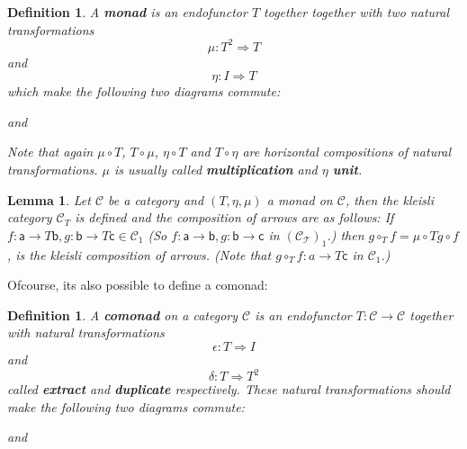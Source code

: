 \documentclass{article}
\newcommand{\cat}[1]{\mathcal{#1}} %
\newcommand{\catm}[1]{\cat{#1}_1} %
\newcommand{\ob}[1]{\mathsf{#1}} %
\newtheorem{lemma}[theorem]{Lemma}
\newtheorem{definition}[theorem]{Definition}
\begin{document}
\begin{definition}
	A \textbf{monad} is an endofunctor $T$ together together with two natural transformations
	$$ \mu: T^2 \Rightarrow T $$
	and
	$$ \eta: I \Rightarrow T $$
	which make the following two diagrams commute:

	and
	Note that again $\mu \circ T$, $T \circ \mu$, $\eta \circ T$ and $T \circ \eta$ are horizontal compositions of natural transformations.
	$\mu$ is usually called \textbf{multiplication} and $\eta$ \textbf{unit}.
\end{definition}

\begin{lemma}
	Let $\cat{C}$ be a category and $(T, \eta, \mu)$ a monad on $\cat{C}$, then the kleisli category $\cat{C}_T$ is defined and the composition of arrows are as follows:
	If $f: \ob{a} \rightarrow T\ob{b}, g: \ob{b} \rightarrow T\ob{c} \in \catm{C}$ (So $f: \ob{a} \rightarrow \ob{b}, g: \ob{b} \rightarrow \ob{c}$ in $(\cat{C_T})_1$.)
	then $g \circ_T f = \mu \circ Tg \circ f$, is the kleisli composition of arrows. (Note that $g \circ_T f: a \rightarrow T\ob{c}$ in $\catm{C}$.)
\end{lemma}

Ofcourse, its also possible to define a comonad:

\begin{definition}
	A \textbf{comonad} on a category $\cat{C}$ is an endofunctor $T: \cat{C} \rightarrow \cat{C}$ together with natural transformations
	$$ \epsilon: T \Rightarrow I $$
	and
	$$ \delta: T \Rightarrow T^2 $$
	called \textbf{extract} and \textbf{duplicate} respectively.
	These natural transformations should make the following two diagrams commute:

	and
\end{definition}
\end{document}
